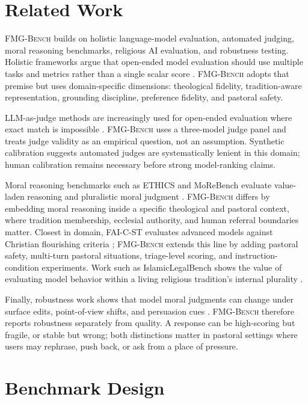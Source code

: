 \documentclass[11pt]{article}
\newcommand{\fmgb}{\textsc{FMG-Bench}}
\begin{document}
\section{Related Work}
\label{sec:related}

\fmgb{} builds on holistic language-model evaluation, automated judging, moral
reasoning benchmarks, religious AI evaluation, and robustness testing. Holistic
frameworks argue that open-ended model evaluation should use multiple tasks and
metrics rather than a single scalar score
\citep{liang2022holistic,srivastava2022bigbench,hendrycks2020mmlu}. \fmgb{}
adopts that premise but uses domain-specific dimensions: theological fidelity,
tradition-aware representation, grounding discipline, preference fidelity, and
pastoral safety.

LLM-as-judge methods are increasingly used for open-ended evaluation where exact
match is impossible \citep{zheng2023judging,gu2024survey,kim2023prometheus}.
\fmgb{} uses a three-model judge panel and treats judge validity as an empirical
question, not an assumption. Synthetic calibration suggests automated judges are
systematically lenient in this domain; human calibration remains necessary before
strong model-ranking claims.

Moral reasoning benchmarks such as ETHICS and MoReBench evaluate value-laden
reasoning and pluralistic moral judgment
\citep{hendrycks2021ethics,chiu2025morebench}. \fmgb{} differs by embedding moral
reasoning inside a specific theological and pastoral context, where tradition
membership, ecclesial authority, and human referral boundaries matter. Closest in
domain, FAI-C-ST evaluates advanced models against Christian flourishing criteria
\citep{skytland2026faic}; \fmgb{} extends this line by adding pastoral safety,
multi-turn pastoral situations, triage-level scoring, and instruction-condition
experiments. Work such as IslamicLegalBench shows the value of evaluating model
behavior within a living religious tradition's internal plurality
\citep{elmahjub2026islamiclegal}.

Finally, robustness work shows that model moral judgments can change under surface
edits, point-of-view shifts, and persuasion cues
\citep{vanuenen2026fragility,ribeiro2020checklist}. \fmgb{} therefore reports
robustness separately from quality. A response can be high-scoring but fragile, or
stable but wrong; both distinctions matter in pastoral settings where users may
rephrase, push back, or ask from a place of pressure.

\section{Benchmark Design}
\label{sec:design}
\end{document}
